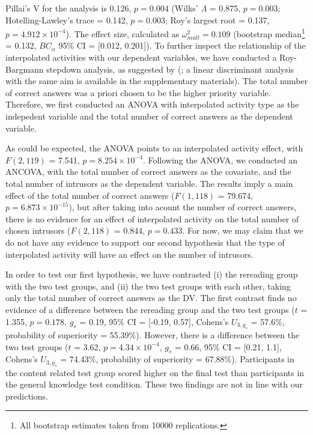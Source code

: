 \documentclass[11pt,]{article}
\let\rmarkdownfootnote\footnote%
\def\footnote{\protect\rmarkdownfootnote}
\begin{document}
Pillai's V for the analysis is 0.126, \(p = 0.004\) (Wilks' \(\Lambda\)
= 0.875, \(p = 0.003\); Hotelling-Lawley's trace = 0.142, \(p = 0.003\);
Roy's largest root = 0.137, \(p = 4.912\times 10^{-4}\)). The effect
size, calculated as \(\omega^2_{mult} = 0.109\) (bootstrap
median\footnote{All bootstrap estimates taken from 10000 replications.}
= 0.132, \(BC_\alpha\) 95\% CI = {[}0.012, 0.201{]}). To further inspect
the relationship of the interpolated activities with our dependent
variables, we have conducted a Roy-Bargmann stepdown analysis, as
suggested by \citeauthor{tabachnickUsingMultivariateStatistics2012}
(\citeyear{tabachnickUsingMultivariateStatistics2012}; a linear
discriminant analysis with the same aim is available in the
supplementary materials). The total number of correct answers was a
priori chosen to be the higher priority variable. Therefore, we first
conducted an ANOVA with interpolated activity type as the indepedent
variable and the total number of correct answers as the dependent
variable.

As could be expected, the ANOVA points to an interpolated activity
effect, with \(F(2, 119)\) = 7.541, \(p = 8.254\times 10^{-4}\).
Following the ANOVA, we conducted an ANCOVA, with the total number of
correct answers as the covariate, and the total number of intrusors as
the dependent variable. The results imply a main effect of the total
number of correct answers (\(F(1, 118)\) = 79.674,
\(p = 6.873\times 10^{-15}\)), but after taking into acount the number
of correct answers, there is no evidence for an effect of interpolated
activity on the total number of chosen intrusors (\(F (2, 118)\) =
0.844, \(p = 0.433\). For now, we may claim that we do not have any
evidence to support our second hypothesis that the type of interpolated
activity will have an effect on the number of intrusors.

In order to test our first hypothesis, we have contrasted (i) the
rereading group with the two test groups, and (ii) the two test groups
with each other, taking only the total number of correct answers as the
DV. The first contrast finds no evidence of a difference between the
rereading group and the two test groups (\(t\) = 1.355, \(p = 0.178\),
\(g_s\) = 0.19, 95\% CI = {[}-0.19, 0.57{]}, Cohens's \(U_{3, g_s}\) =
57.6\%, probability of superiority = 55.39\%). However, there is a
difference between the two test groups (\(t\) = 3.62,
\(p = 4.34\times 10^{-4}\), \(g_s\) = 0.66, 95\% CI = {[}0.21, 1.1{]},
Cohens's \(U_{3, g_s}\) = 74.43\%, probability of superiority =
67.88\%). Participants in the content related test group scored higher
on the final test than participants in the general knowledge test
condition. These two findings are not in line with our predictions.
\end{document}
